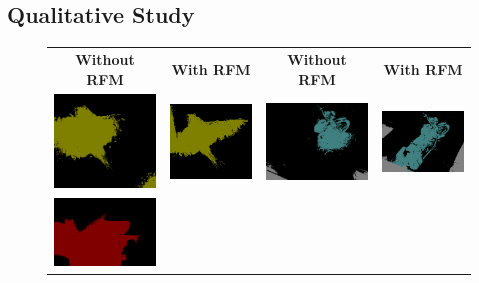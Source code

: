 \subsection{Qualitative Study}
\begin{figure}[H]
  \centering
  \setlength{\tabcolsep}{0.5pt} %
  \renewcommand{\arraystretch}{0.4}

  \begin{tabular}{c c c c}
    \textbf{Without RFM} & \textbf{With RFM} & \hspace{4pt} \textbf{Without RFM} & \textbf{With RFM} \\
    [2pt]
    \includegraphics[width=0.18\linewidth, height=0.18\linewidth]{figures/ablation/withoutrfm/2008_001185_[2]} &
    \includegraphics[width=0.18\linewidth, height=0.18\linewidth]{figures/ablation/withrfm/2008_001185_[2]} & \hspace{2pt}
    \includegraphics[width=0.18\linewidth, height=0.18\linewidth]{figures/ablation/withoutrfm/2008_007558_[6, 13]} &
    \includegraphics[width=0.18\linewidth, height=0.18\linewidth]{figures/ablation/withrfm/2008_007558_[6, 13]} \\
    [1mm]
    \includegraphics[width=0.18\linewidth, height=0.18\linewidth]{figures/ablation/withoutrfm/2011_001753_[0]} &

\end{tabular}
\end{figure}
